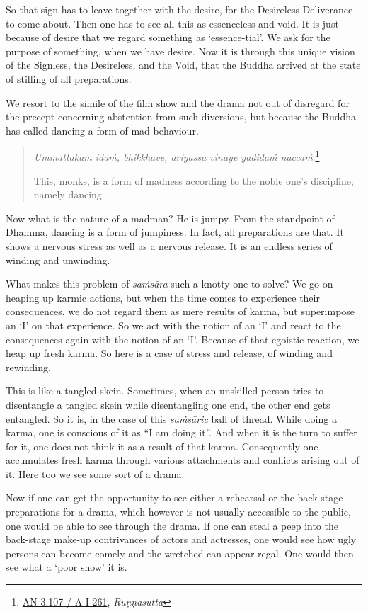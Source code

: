 So that sign has to leave together with the desire, for the Desireless Deliverance to come about. Then one has to see all this as essenceless and void. It is just because of desire that we regard something as `essence-tial'. We ask for the purpose of something, when we have desire. Now it is through this unique vision of the Signless, the Desireless, and the Void, that the Buddha arrived at the state of stilling of all preparations.

We resort to the simile of the film show and the drama not out of disregard for the precept concerning abstention from such diversions, but because the Buddha has called dancing a form of mad behaviour.

\begin{quote}
\emph{Ummattakam idaṁ, bhikkhave, ariyassa vinaye yadidaṁ naccaṁ}.\footnote{\href{https://suttacentral.net/an3.107/pli/ms}{AN 3.107 / A I 261}, \emph{Ruṇṇasutta}}

This, monks, is a form of madness according to the noble one's discipline, namely dancing.
\end{quote}

Now what is the nature of a madman? He is jumpy. From the standpoint of Dhamma, dancing is a form of jumpiness. In fact, all preparations are that. It shows a nervous stress as well as a nervous release. It is an endless series of winding and unwinding.

What makes this problem of \emph{saṁsāra} such a knotty one to solve? We go on heaping up karmic actions, but when the time comes to experience their consequences, we do not regard them as mere results of karma, but superimpose an `I' on that experience. So we act with the notion of an `I' and react to the consequences again with the notion of an `I'. Because of that egoistic reaction, we heap up fresh karma. So here is a case of stress and release, of winding and rewinding.

This is like a tangled skein. Sometimes, when an unskilled person tries to disentangle a tangled skein while disentangling one end, the other end gets entangled. So it is, in the case of this \emph{saṁsāric} ball of thread. While doing a karma, one is conscious of it as ``I am doing it''. And when it is the turn to suffer for it, one does not think it as a result of that karma. Consequently one accumulates fresh karma through various attachments and conflicts arising out of it. Here too we see some sort of a drama.

Now if one can get the opportunity to see either a rehearsal or the back-stage preparations for a drama, which however is not usually accessible to the public, one would be able to see through the drama. If one can steal a peep into the back-stage make-up contrivances of actors and actresses, one would see how ugly persons can become comely and the wretched can appear regal. One would then see what a `poor show' it is.


